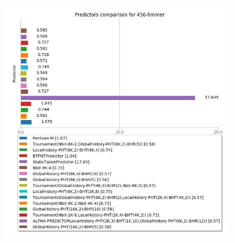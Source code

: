    \begin{minipage}{\textwidth}
      \begin{center}
         \\
         \vspace{3mm}
         \includegraphics[width=0.9\textwidth, frame]{./graphs/4-5/456-hmmer.png}
         \vspace{6mm}
      \end{center}
   \end{minipage}

